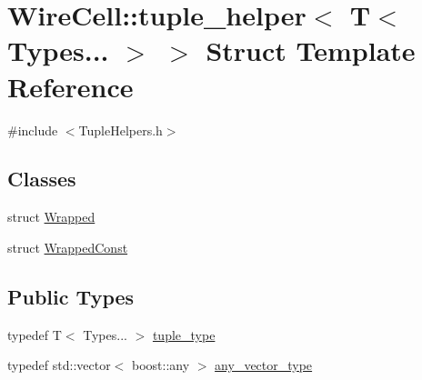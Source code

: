 \hypertarget{struct_wire_cell_1_1tuple__helper_3_01_t_3_01_types_8_8_8_01_4_01_4}{}\section{Wire\+Cell\+:\+:tuple\+\_\+helper$<$ T$<$ Types... $>$ $>$ Struct Template Reference}
\label{struct_wire_cell_1_1tuple__helper_3_01_t_3_01_types_8_8_8_01_4_01_4}


{\ttfamily \#include $<$Tuple\+Helpers.\+h$>$}

\subsection*{Classes}
\begin{DoxyCompactItemize}
\item 
struct \hyperlink{struct_wire_cell_1_1tuple__helper_3_01_t_3_01_types_8_8_8_01_4_01_4_1_1_wrapped}{Wrapped}
\item 
struct \hyperlink{struct_wire_cell_1_1tuple__helper_3_01_t_3_01_types_8_8_8_01_4_01_4_1_1_wrapped_const}{Wrapped\+Const}
\end{DoxyCompactItemize}
\subsection*{Public Types}
\begin{DoxyCompactItemize}
\item 
typedef T$<$ Types... $>$ \hyperlink{struct_wire_cell_1_1tuple__helper_3_01_t_3_01_types_8_8_8_01_4_01_4_aef55cc988f5f41eff16f4a116bbd5fc5}{tuple\+\_\+type}
\item 
typedef std\+::vector$<$ boost\+::any $>$ \hyperlink{struct_wire_cell_1_1tuple__helper_3_01_t_3_01_types_8_8_8_01_4_01_4_a09d92f40f36eccfe85165e6ab93a6217}{any\+\_\+vector\+\_\+type}
\end{DoxyCompactItemize}
